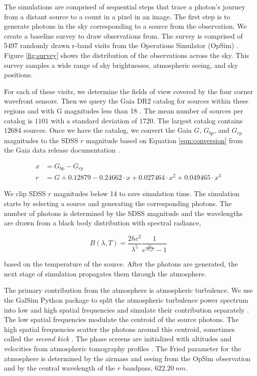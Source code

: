 The simulations are comprised of sequential steps that trace a photon's journey from a distant source to a count in a pixel in an image. The first step is to generate photons in the sky corresponding to a source from the observation. We create a baseline survey to draw observations from. The survey is comprised of 5497 randomly drawn r-band visits from the Operations Simulator (OpSim) \cite{opsim}. Figure \ref{fig:survey} shows the distribution of the observations across the sky. This survey samples a wide range of sky brightnesses, atmospheric seeing, and sky positions. 

For each of these visits, we determine the fields of view covered by the four corner wavefront sensors. Then we query the Gaia DR2 catalog for sources within these regions and with G magnitudes less than 18 \cite{dr2}. The mean number of sources per catalog is $1101$ with a standard deviation of $1720$. The largest catalog contains $12684$ sources. Once we have the catalog, we convert the Gaia $G$, $G_{bp}$, and $G_{rp}$ magnitudes to the SDSS $r$ magnitude based on Equation \ref{eqn:conversion} from the Gaia data release documentation \cite{conversion}.

\begin{align}\label{eqn:conversion}
x &= G_{bp} - G_{rp}\\
r &= G + 0.12879 - 0.24662 \cdot x + 0.027464 \cdot x^2 + 0.049465 \cdot x^3
\end{align}

\noindent We clip SDSS $r$ magnitudes below 14 to save simulation time. The simulation starts by selecting a source and generating the corresponding photons. The number of photons is determined by the SDSS magnitude and the wavelengths are drawn from a black body distribution with spectral radiance,

\begin{equation}\label{eqn:blackbody}
B(\lambda, T) = \frac{2hc^2}{\lambda^5}\frac{1}{e^{\frac{hc}{\lambda k_B T}} - 1}
\end{equation}

\noindent based on the temperature of the source. After the photons are generated, the next stage of simulation propagates them through the atmosphere.

The primary contribution from the atmosphere is atmospheric turbulence. We use the GalSim Python package to split the atmospheric turbulence power spectrum into low and high spatial frequencies and simulate their contribution separately \cite{galsim}. The low spatial frequencies modulate the centroid of the source photons. The high spatial frequencies scatter the photons around this centroid, sometimes called the \textit{second kick} \cite{phosim}. The phase screens are initialized with altitudes and velocities from atmospheric tomography profiles \cite{atmosphere}. The Fried parameter for the atmosphere is determined by the airmass and seeing from the OpSim observation and by the central wavelength of the $r$ bandpass, $622.20\ nm$. 


